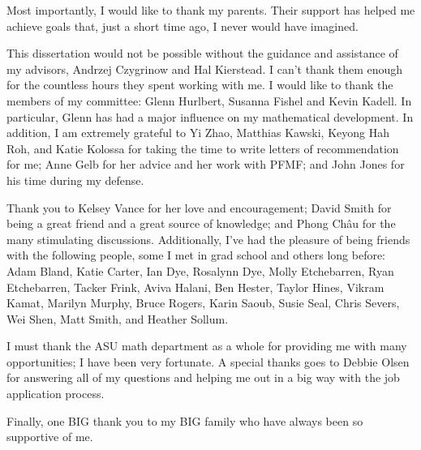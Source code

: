 \documentclass[oneside,12pt]{memoir}
\begin{document}
\asuacknowledgements
{Most importantly, I would like to thank my parents.  Their support has helped me achieve goals that, just a short time ago, I never would have imagined.

This dissertation would not be possible without the guidance and assistance of my advisors, Andrzej Czygrinow and Hal Kierstead.  %
I can't thank them enough for the countless hours they spent working with me.  
I would like to thank the members of my committee: Glenn Hurlbert, Susanna Fishel and Kevin Kadell.  In particular, Glenn has had a major influence on my mathematical development. %
In addition, I am extremely grateful to Yi Zhao, Matthias Kawski, Keyong Hah Roh, and Katie Kolossa for taking the time to write letters of recommendation for me; Anne Gelb for her advice and her work with PFMF; and John Jones for his time during my defense.%

Thank you to Kelsey Vance for her love and encouragement; David Smith for being a great friend and a great source of knowledge; and Phong Ch\^au for the many stimulating discussions.  Additionally, I've had the pleasure of being friends with the following people, some I met in grad school and others long before: Adam Bland, Katie Carter, Ian Dye, Rosalynn Dye, Molly Etchebarren, Ryan Etchebarren, Tacker Frink, Aviva Halani, Ben Hester, Taylor Hines, Vikram Kamat, Marilyn Murphy, Bruce Rogers, Karin Saoub, Susie Seal, Chris Severs, Wei Shen, Matt Smith, and Heather Sollum.

I must thank the ASU math department as a whole for providing me with many opportunities; I have been very fortunate.  
A special thanks goes to Debbie Olsen for answering all of my questions and helping me out in a big way with the job application process.

Finally, one BIG thank you to my BIG family who have always been so supportive of me.
}
\end{document}
